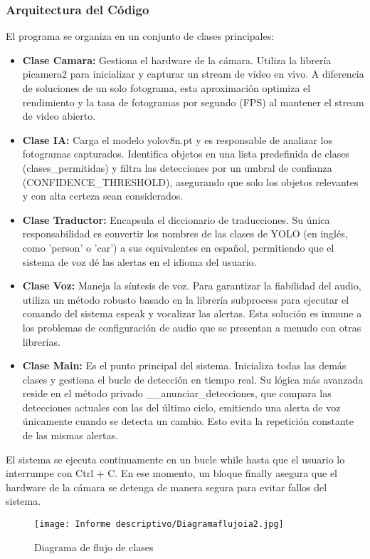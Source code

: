 \documentclass[12pt,a4paper]{article}
\begin{document}
\subsubsection{Arquitectura del Código}
El programa se organiza en un conjunto de clases principales:
\begin{itemize}
\item \textbf{Clase Camara:} Gestiona el hardware de la cámara. Utiliza la librería picamera2 para inicializar y capturar un stream de video en vivo. A diferencia de soluciones de un solo fotograma, esta aproximación optimiza el rendimiento y la tasa de fotogramas por segundo (FPS) al mantener el stream de video abierto.
\item \textbf{Clase IA:} Carga el modelo yolov8n.pt y es responsable de analizar los fotogramas capturados. Identifica objetos en una lista predefinida de clases (clases\_permitidas) y filtra las detecciones por un umbral de confianza (CONFIDENCE\_THRESHOLD), asegurando que solo los objetos relevantes y con alta certeza sean considerados.
\item \textbf{Clase Traductor:} Encapsula el diccionario de traducciones. Su única responsabilidad es convertir los nombres de las clases de YOLO (en inglés, como 'person' o 'car') a sus equivalentes en español, permitiendo que el sistema de voz dé las alertas en el idioma del usuario.
\item \textbf{Clase Voz:} Maneja la síntesis de voz. Para garantizar la fiabilidad del audio, utiliza un método robusto basado en la librería subprocess para ejecutar el comando del sistema espeak y vocalizar las alertas. Esta solución es inmune a los problemas de configuración de audio que se presentan a menudo con otras librerías.
\item \textbf{Clase Main:} Es el punto principal del sistema. Inicializa todas las demás clases y gestiona el bucle de detección en tiempo real. Su lógica más avanzada reside en el método privado \_\_anunciar\_detecciones, que compara las detecciones actuales con las del último ciclo, emitiendo una alerta de voz únicamente cuando se detecta un cambio. Esto evita la repetición constante de las mismas alertas.
\end{itemize}
El sistema se ejecuta continuamente en un bucle while hasta que el usuario lo interrumpe con Ctrl + C. En ese momento, un bloque finally asegura que el hardware de la cámara se detenga de manera segura para evitar fallos del sistema.

\begin{figure}[H]
\noindent\hspace*{-0.7in}%
\texttt{[image: Informe descriptivo/Diagramaflujoia2.jpg]}
\caption{Diagrama de flujo de clases}
\end{figure}
\end{document}
